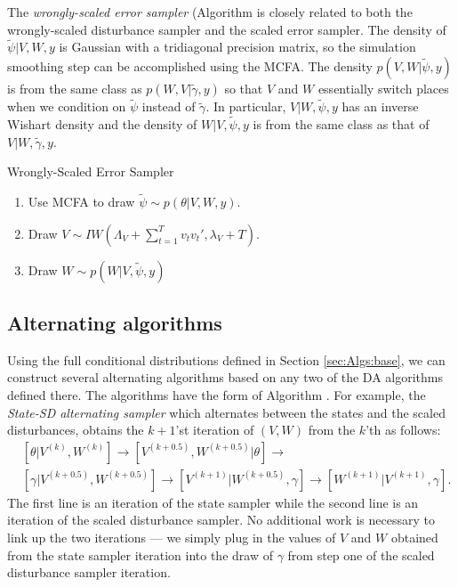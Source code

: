 \documentclass[12pt]{article}
\begin{document}
The {\it wrongly-scaled error sampler} (Algorithm  is closely related to both the wrongly-scaled disturbance sampler and the scaled error sampler. The density of $\tilde{\psi}|V,W,y$ is Gaussian with a tridiagonal precision matrix, so the simulation smoothing step can be accomplished using the MCFA. The density $p(V,W|\tilde{\psi},y)$ is from the same class as $p(W,V|\tilde{\gamma},y)$ so that $V$ and $W$ essentially switch places when we condition on $\tilde{\psi}$ instead of $\tilde{\gamma}$. In particular, $V|W,\tilde{\psi},y$ has an inverse Wishart density and the density of $W|V,\tilde{\psi},y$ is from the same class as that of $V|W,\tilde{\gamma},y$.
\begin{alg*}[WSE]Wrongly-Scaled Error Sampler\label{alg:DLMwerror}
\begin{enumerate}
\item Use MCFA to draw $\tilde{\psi} \sim p(\theta|V,W,y)$.
\item Draw $V \sim IW\left(\Lambda_V + \sum_{t=1}^Tv_tv_t',\lambda_V + T\right)$.
\item Draw $W \sim p(W|V,\tilde{\psi},y)$
\end{enumerate}
\end{alg*}


\subsection{Alternating algorithms}\label{sec:Algs:alt}
Using the full conditional distributions defined in Section \ref{sec:Algs:base}, we can construct several alternating algorithms based on any two of the DA algorithms defined there. The algorithms have the form of Algorithm . For example, the {\it State-SD alternating sampler} which alternates between the states and the scaled disturbances, obtains the $k+1$'st iteration of $(V,W)$ from the $k$'th as follows:
\begin{align*}
&[\theta|V^{(k)},W^{(k)}] \to [V^{(k+0.5)},W^{(k+0.5)}|\theta] \to\\
&[\gamma|V^{(k+0.5)},W^{(k+0.5)}] \to [V^{(k+1)}|W^{(k+0.5)},\gamma] \to [W^{(k+1)}|V^{(k+1)},\gamma].
\end{align*}
The first line is an iteration of the state sampler while the second line is an iteration of the scaled disturbance sampler. No additional work is necessary to link up the two iterations --- we simply plug in the values of $V$ and $W$ obtained from the state sampler iteration into the draw of $\gamma$ from step one of the scaled disturbance sampler iteration.
\end{document}
